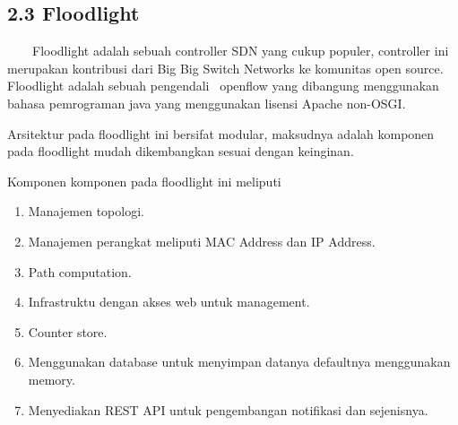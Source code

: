 \subsection{2.3 Floodlight}
\ \ \ \ Floodlight adalah sebuah controller SDN yang cukup populer, controller ini merupakan kontribusi dari Big Big Switch
Networks ke komunitas open source. Floodlight adalah sebuah pengendali \ openflow yang dibangung menggunakan bahasa
pemrograman java yang menggunakan lisensi Apache non-OSGI. 

Arsitektur pada floodlight ini bersifat modular, maksudnya adalah komponen pada floodlight mudah dikembangkan sesuai
dengan keinginan. 

Komponen komponen pada floodlight ini meliputi
\liststyleLvi
\begin{enumerate}
\item Manajemen topologi.
\item Manajemen perangkat meliputi MAC Address dan IP Address.
\item Path computation.
\item Infrastruktu dengan akses web untuk management.
\item Counter store.
\item Menggunakan database untuk menyimpan datanya defaultnya menggunakan memory.
\item Menyediakan REST API untuk pengembangan notifikasi dan sejenisnya.
\end{enumerate}
